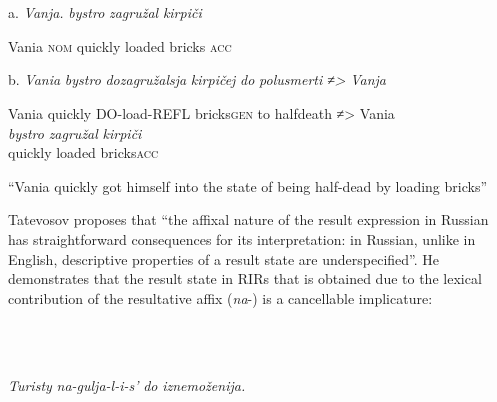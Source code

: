 \documentclass[output=paper,modfonts, nonflat]{langsci/langscibook}
\begin{document}
\begin{styleinnerExample}
\begin{styleinnerExample}
\ea%
    \label{ex:key:41}
    \gll\\
        \\
    \glt
    \z

           a.  \textit{Vanja.}         \textit{bystro}   \textit{zagružal} \textit{kirpiči}
\end{styleinnerExample}

\begin{styleinnerExample}
    Vania \textsc{nom} quickly loaded     bricks \textsc{acc}
\end{styleinnerExample}

\begin{styleinnerExample}
  b.  \textit{Vania} \textit{bystro}     \textit{dozagružalsja}   \textit{kirpičej}       \textit{do}  \textit{polusmerti} \textit{≠>} \textit{Vanja} 
\end{styleinnerExample}

\begin{styleinnerExample}
    Vania quickly DO-load-REFL   bricks\textsc{gen}  to  halfdeath  ≠> Vania \\
\textit{bystro}   \textit{zagružal}   \textit{kirpiči\\
}quickly loaded   bricks\textsc{acc}
\end{styleinnerExample}

\begin{styleinnerExample}
    “Vania quickly got himself into the state of being half-dead by loading bricks”
\end{styleinnerExample}

Tatevosov proposes that “the affixal nature of the result expression in Russian has straightforward consequences for its interpretation: in Russian, unlike in English, descriptive properties of a result state are underspecified”. He demonstrates that the result state in RIRs that is obtained due to the lexical contribution of the resultative affix (\textit{na}{}-) is a cancellable implicature: \\

\begin{styleinnerExample}
\ea%
    \label{ex:key:42}
    \gll\\
        \\
    \glt
    \z

          \textit{Turisty} \textit{na-gulja-l-i-s’}                     \textit{do} \textit{iznemoženija.} \citep{Tatevosov2010}
\end{styleinnerExample}


\end{styleinnerExample}
\end{document}
